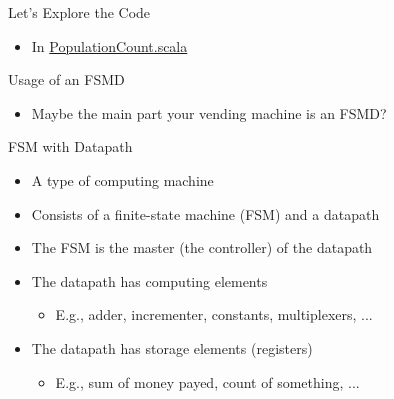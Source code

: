 \begin{frame}[fragile]{Let's Explore the Code}
\begin{itemize}
\item In \href{https://github.com/schoeberl/chisel-book/blob/master/src/main/scala/PopulationCount.scala}{PopulationCount.scala}
\end{itemize}
\end{frame}

\begin{frame}[fragile]{Usage of an FSMD}
\begin{itemize}
\item Maybe the main part your vending machine is an FSMD?
\end{itemize}
\end{frame}






\begin{frame}[fragile]{FSM with Datapath}
\begin{itemize}
\item A type of computing machine
\item Consists of a finite-state machine (FSM) and a datapath
\item The FSM is the master (the controller) of the datapath
\item The datapath has computing elements
\begin{itemize}
\item E.g., adder, incrementer, constants, multiplexers, ...
\end{itemize}
\item The datapath has storage elements (registers)
\begin{itemize}
\item E.g., sum of money payed, count of something, ...
\end{itemize}
\end{itemize}
\end{frame}

